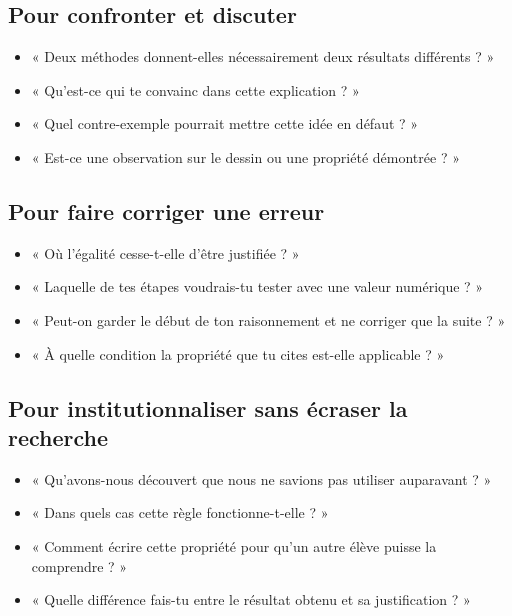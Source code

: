 \documentclass[11pt,a4paper]{article}
\begin{document}
\subsection{Pour confronter et discuter}
\begin{itemize}
\item « Deux méthodes donnent-elles nécessairement deux résultats différents ? »
\item « Qu'est-ce qui te convainc dans cette explication ? »
\item « Quel contre-exemple pourrait mettre cette idée en défaut ? »
\item « Est-ce une observation sur le dessin ou une propriété démontrée ? »
\end{itemize}
\subsection{Pour faire corriger une erreur}
\begin{itemize}
\item « Où l'égalité cesse-t-elle d'être justifiée ? »
\item « Laquelle de tes étapes voudrais-tu tester avec une valeur numérique ? »
\item « Peut-on garder le début de ton raisonnement et ne corriger que la suite ? »
\item « À quelle condition la propriété que tu cites est-elle applicable ? »
\end{itemize}
\subsection{Pour institutionnaliser sans écraser la recherche}
\begin{itemize}
\item « Qu'avons-nous découvert que nous ne savions pas utiliser auparavant ? »
\item « Dans quels cas cette règle fonctionne-t-elle ? »
\item « Comment écrire cette propriété pour qu'un autre élève puisse la comprendre ? »
\item « Quelle différence fais-tu entre le résultat obtenu et sa justification ? »
\end{itemize}
\end{document}
